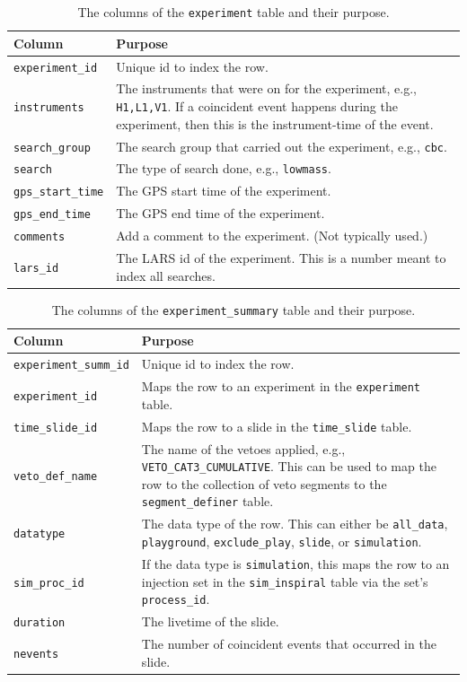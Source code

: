 \begin{table}
\label{tab:experiment}
\center
\begin{tabular}{l | p{9cm}}
Column      &   Purpose     \\
\hline \hline
\texttt{experiment\_id}  &  Unique id to index the row. \\
\hline
\texttt{instruments}    &  The instruments that were on for the experiment, e.g., \texttt{H1,L1,V1}. If a coincident event happens during the experiment, then this is the instrument-time of the event.\\
\hline
\texttt{search\_group}  &  The search group that carried out the experiment, e.g., \texttt{cbc}. \\
\hline
\texttt{search}     &   The type of search done, e.g., \texttt{lowmass}. \\
\hline
\texttt{gps\_start\_time}   &   The GPS start time of the experiment. \\
\hline
\texttt{gps\_end\_time}     &   The GPS end time of the experiment. \\
\hline
\texttt{comments}   &  Add a comment to the experiment. (Not typically used.) \\
\hline
\texttt{lars\_id}   & The LARS id of the experiment. This is a number meant to index all searches. \\
\end{tabular}
\caption{The columns of the \texttt{experiment} table and their purpose.}
\end{table}

\begin{table}
\label{tab:experiment_summary}
\center
\begin{tabular}{l | p{9cm}}
Column      &   Purpose     \\
\hline \hline
\texttt{experiment\_summ\_id}   &   Unique id to index the row. \\
\hline
\texttt{experiment\_id}     &   Maps the row to an experiment in the \texttt{experiment} table. \\
\hline
\texttt{time\_slide\_id}    &   Maps the row to a slide in the \texttt{time\_slide} table. \\
\hline
\texttt{veto\_def\_name}    &   The name of the vetoes applied, e.g., \texttt{VETO\_CAT3\_CUMULATIVE}. This can be used to map the row to the collection of veto segments to the \texttt{segment\_definer} table. \\
\hline
\texttt{datatype}   &   The data type of the row. This can either be \texttt{all\_data}, \texttt{playground}, \texttt{exclude\_play}, \texttt{slide}, or \texttt{simulation}. \\
\hline
\texttt{sim\_proc\_id}  &   If the data type is \texttt{simulation}, this maps the row to an injection set in the \texttt{sim\_inspiral} table via the set's \texttt{process\_id}. \\
\hline
\texttt{duration}   &   The livetime of the slide. \\
\hline
\texttt{nevents}    &   The number of coincident events that occurred in the slide.
\end{tabular}
\caption{The columns of the \texttt{experiment\_summary} table and their purpose.}
\end{table}

